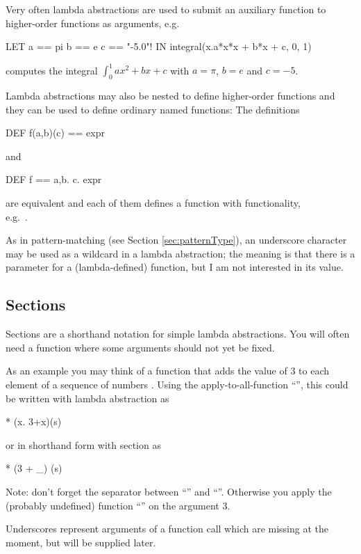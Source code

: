 Very often  lambda abstractions are used to  submit an auxiliary
function to  higher-order functions as arguments, e.g. 
 \begin{prog}
         LET a == pi
             b == e
             c == "-5.0"!
         IN integral(\LAMBDA{}x.a*x*x + b*x + c, 0, 1)\end{prog}
computes the integral $\int_{0}^{1}a x^2 + b x + c$ with $a=\pi$,
$b=e$ and $c=-5$.
\bigskip

Lambda abstractions may also be nested to define higher-order
functions and they can be used to define ordinary named functions:
The definitions
\begin{prog}
        DEF f(a,b)(c) == expr
\end{prog}
and
\begin{prog}
        DEF f == \LAMBDA{}a,b. \LAMBDA{}c. expr
\end{prog}
are equivalent and each of them defines a function with functionality, \\
e.g.~.

As in  pattern-matching (see Section \ref{sec:patternType}), an
underscore character may be used as a wildcard in a lambda
abstraction;  the meaning is that there is a parameter for a
(lambda-defined) function, 
but I am not interested in its value.


\subsection{Sections}
\label{sec:sections}
\advanced Sections are a shorthand notation for simple lambda
abstractions.
You will often  need a function where some arguments should not yet be
fixed.

As an example you may think of a function that adds the value of 3 to
each element of a sequence of numbers .
Using the apply-to-all-function ``\pro{*}'', this could be written with lambda
abstraction as
\begin{prog}
        * (\LAMBDA x. 3+x)(s)
\end{prog}
or in shorthand form with section as
\begin{prog}
        * (3 + _) (s)
\end{prog}
Note: don't forget the separator between ``\pro{+}'' and ``\pro{\_}''.
Otherwise you apply the (probably undefined) function ``\pro{+\_}'' on the
argument 3.

Underscores represent arguments of a function call which are
missing at the moment, but will be supplied later.

